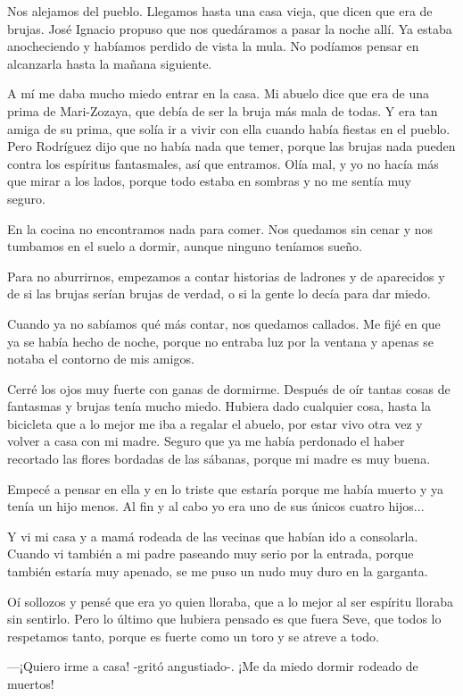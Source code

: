 \documentclass{barcodevapor3pags}
\begin{document}
Nos alejamos del pueblo. Llegamos hasta una casa vieja, que dicen que
era de brujas. José Ignacio propuso que nos quedáramos a pasar la noche
allí. Ya estaba anocheciendo y habíamos perdido de vista la mula. No
podíamos pensar en alcanzarla hasta la mañana siguiente.~

A mí me daba mucho miedo entrar en la casa. Mi abuelo dice que era de
una prima de Mari-Zozaya, que debía de ser la bruja más mala de todas. Y
era tan amiga de su prima, que solía ir a vivir con ella cuando había
fiestas en el pueblo. Pero Rodríguez dijo que no había nada que temer,
porque las brujas nada pueden contra los espíritus fantasmales, así que
entramos. Olía mal, y yo no hacía más que mirar a los lados, porque todo
estaba en sombras y no me sentía muy seguro.~

En la cocina no encontramos nada para comer. Nos quedamos sin cenar y
nos tumbamos en el suelo a dormir, aunque ninguno teníamos sueño.~

Para no aburrirnos, empezamos a contar historias de ladrones y de
aparecidos y de si las brujas serían brujas de verdad, o si la gente lo
decía para dar miedo.~

Cuando ya no sabíamos qué más contar, nos quedamos callados. Me fijé en
que ya se había hecho de noche, porque no entraba luz por la ventana y
apenas se notaba el contorno de mis amigos.~

Cerré los ojos muy fuerte con ganas de dormirme. Después de oír tantas
cosas de fantasmas y brujas tenía mucho miedo. Hubiera dado cualquier
cosa, hasta la bicicleta que a lo mejor me iba a regalar el abuelo, por
estar vivo otra vez y volver a casa con mi madre. Seguro que ya me había
perdonado el haber recortado las flores bordadas de las sábanas, porque
mi madre es muy buena.~

Empecé a pensar en ella y en lo triste que estaría porque me había
muerto y ya tenía un hijo menos. Al fin y al cabo yo era uno de sus
únicos cuatro hijos...~

Y vi mi casa y a mamá rodeada de las vecinas que habían ido a
consolarla. Cuando vi también a mi padre paseando muy serio por la
entrada, porque también estaría muy apenado, se me puso un nudo muy duro
en la garganta.~

Oí sollozos y pensé que era yo quien lloraba, que a lo mejor al ser
espíritu lloraba sin sentirlo. Pero lo último que hubiera pensado es que
fuera Seve, que todos lo respetamos tanto, porque es fuerte como un toro
y se atreve a todo.~

---¡Quiero irme a casa! -gritó angustiado-. ¡Me da miedo dormir rodeado
de muertos!~
\end{document}
